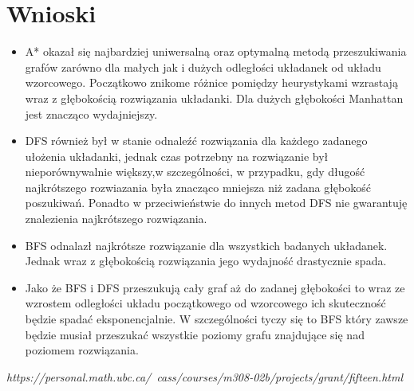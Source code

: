 \documentclass{classrep}
\begin{document}
{\begin{itemize}
\begin{itemize}
                \end{itemize}
            \end{itemize}

      }\label{sec:dyskusja}

    \section{Wnioski}
    {
        \begin{itemize}
            \item A* okazał się najbardziej uniwersalną oraz optymalną metodą przeszukiwania grafów zarówno dla małych jak i dużych odległości układanek od układu wzorcowego. Początkowo znikome różnice pomiędzy heurystykami wzrastają wraz z głębokością rozwiązania układanki. Dla dużych głębokości Manhattan jest
            znacząco wydajniejszy.
            \item DFS również był w stanie odnaleźć rozwiązania dla każdego zadanego ułożenia układanki, jednak czas potrzebny na rozwiązanie był nieporównywalnie większy,w szczególności, w przypadku, gdy długość najkrótszego rozwiazania była znacząco mniejsza niż zadana głębokość poszukiwań. Ponadto w przeciwieństwie do innych metod DFS nie gwarantuję znalezienia najkrótszego rozwiązania.
            \item BFS odnalazł najkrótsze rozwiązanie dla wszystkich badanych układanek. Jednak wraz z głębokością rozwiązania jego wydajność drastycznie spada.
            \item Jako że BFS i DFS przeszukują cały graf aż do zadanej głębokości to wraz ze wzrostem odległości układu początkowego od wzorcowego ich skuteczność będzie
            spadać eksponencjalnie. W szczególności tyczy się to BFS który zawsze będzie musiał przeszukać wszystkie poziomy grafu znajdujące się nad poziomem rozwiązania.


        \end{itemize}



    }\label{sec:wnioski}

    \begin{thebibliography}{0}
        \textsl{https://personal.math.ubc.ca/~cass/courses/m308-02b/projects/grant/fifteen.html}
    \end{thebibliography}
\end{document}
